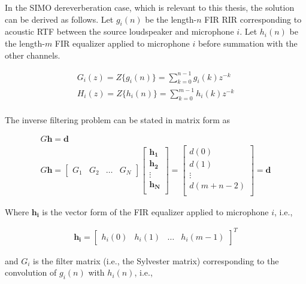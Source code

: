 In the SIMO dereverberation case, which is relevant to this thesis, the solution can be derived as follows. Let $g_i(n)$ be the length-$n$ FIR RIR corresponding to acoustic RTF between the source loudspeaker and microphone $i$. Let $h_i(n)$ be the length-$m$ FIR equalizer applied to microphone $i$ before summation with the other channels. 

\begin{eqnarray}
	G_i(z) = Z\{g_i(n)\} = \sum_{k=0}^{n-1}g_i(k)z^{-k} \\
	H_i(z) = Z\{h_i(n)\} = \sum_{k=0}^{m-1}h_i(k)z^{-k} \\
\end{eqnarray}

The inverse filtering problem can be stated in matrix form as

\begin{eqnarray}
	G\boldsymbol{h}=\boldsymbol{d} \label{eq:MINT_problem} \\
	G\boldsymbol{h} =
	\begin{bmatrix}
		G_1 & G_2 & \dots& G_N
	\end{bmatrix} 
	\begin{bmatrix}
		\boldsymbol{h_1} \\
		\boldsymbol{h_2} \\
		\vdots \\
		\boldsymbol{h_N} \\
	\end{bmatrix}
	=
	\begin{bmatrix}
		d(0) \\
		d(1) \\
		\vdots \\
		d(m+n-2) \\
	\end{bmatrix} 
	=
	\boldsymbol{d}
\end{eqnarray}

\noindent
Where $\boldsymbol{h_i}$ is the vector form of the FIR equalizer applied to microphone $i$, i.e.,

\begin{eqnarray}
	\boldsymbol{h_i} = 
		\begin{bmatrix}
			h_i(0) & h_i(1) & \dots & h_i(m-1)
		\end{bmatrix}^T
\end{eqnarray}

\noindent
and $G_i$ is the filter matrix (i.e., the Sylvester matrix) corresponding to the convolution of $g_i(n)$ with $h_i(n)$, i.e.,

